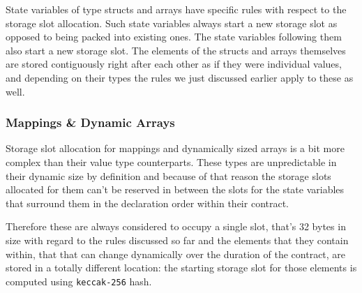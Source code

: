 State variables of type structs and arrays have specific rules with
respect to the storage slot allocation. Such state variables always
start a new storage slot as opposed to being packed into existing ones.
The state variables following them also start a new storage slot. The
elements of the structs and arrays themselves are stored contiguously
right after each other as if they were individual values, and depending
on their types the rules we just discussed earlier apply to these as
well.

\subsubsection{Mappings \& Dynamic
Arrays}\label{mappings-dynamic-arrays}

Storage slot allocation for mappings and dynamically sized arrays is a
bit more complex than their value type counterparts. These types are
unpredictable in their dynamic size by definition and because of that
reason the storage slots allocated for them can't be reserved in between
the slots for the state variables that surround them in the declaration
order within their contract.

Therefore these are always considered to occupy a single slot, that's 32
bytes in size with regard to the rules discussed so far and the elements
that they contain within, that that can change dynamically over the
duration of the contract, are stored in a totally different location:
the starting storage slot for those elements is computed using
\texttt{keccak-256} hash.

